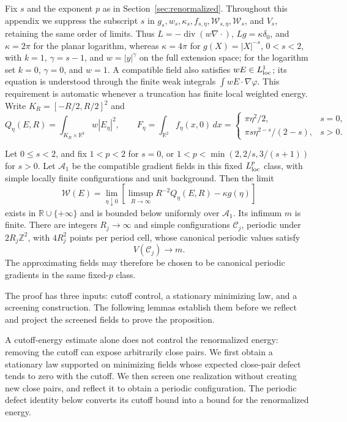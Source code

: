 Fix $s$ and the exponent $p$ as in Section~\ref{sec:renormalized}.
Throughout this appendix we suppress the subscript $s$ in
$g_s,w_s,\kappa_s,f_{s,\eta},\mathcal W_{s,\eta},\mathcal W_s$, and $V_s$,
retaining the same order of limits.
Thus $L=-\operatorname{div}(w\nabla\cdot)$,
$Lg=\kappa\delta_0$, and $\kappa=2\pi$ for the planar logarithm,
whereas $\kappa=4\pi$ for $g(X)=|X|^{-s}$, $0<s<2$, with
$k=1$, $\gamma=s-1$, and $w=|y|^\gamma$ on the full extension
space; for the logarithm set $k=0$, $\gamma=0$, and $w=1$.
A compatible field also
satisfies $wE\in L^1_{\rm loc}$; its equation is understood through
the finite weak integrals $\int wE\cdot\nabla\varphi$.
This requirement is automatic whenever a truncation has finite local
weighted energy.  Write $K_R=[-R/2,R/2]^2$ and
\[
 Q_\eta(E,R)=\int_{K_R\times\mathbb R^k}w|E_\eta|^2,
 \qquad
 F_\eta=\int_{\mathbb R^2}f_\eta(x,0)\,dx
 =\begin{cases}\pi\eta^2/2,&s=0,\\
 \pi s\eta^{2-s}/(2-s),&s>0.
 \end{cases}
\]

\begin{proposition}
\label{prop:normalized-cubic-approximation}
Let $0\le s<2$, and fix
$1<p<2$ for $s=0$, or
$1<p<\min(2,2/s,3/(s+1))$ for $s>0$.
Let $\mathcal A_1$ be the compatible gradient fields in this fixed
$L^p_{\rm loc}$ class, with simple locally finite configurations and
unit background.  Then the limit
\[
 \mathcal W(E)=\lim_{\eta\downarrow0}
 \left[\limsup_{R\to\infty}R^{-2}Q_\eta(E,R)
                    -\kappa g(\eta)\right]
\]
exists in $\mathbb R\cup\{+\infty\}$ and is bounded below uniformly
over $\mathcal A_1$.  Its infimum $m$ is finite.
There are integers $R_j\to\infty$ and simple configurations
$\mathcal C_j$, periodic under $2R_j\mathbb Z^2$, with
$4R_j^2$ points per period cell, whose canonical periodic values satisfy
\[
                   V(\mathcal C_j)\longrightarrow m.
\]
The approximating fields may therefore be chosen to be canonical
periodic gradients in the same fixed-$p$ class.
\end{proposition}

The proof has three inputs: cutoff control, a stationary minimizing law,
and a screening construction. The following lemmas establish them before
we reflect and project the screened fields to prove the proposition.

A cutoff-energy estimate alone does not control the renormalized energy:
removing the cutoff can expose arbitrarily close pairs.  We first obtain a
stationary law supported on minimizing fields whose expected close-pair
defect tends to zero with the cutoff.  We then screen one realization
without creating new close pairs, and reflect it to obtain a periodic
configuration.  The periodic defect identity below converts its cutoff
bound into a bound for the renormalized energy.

